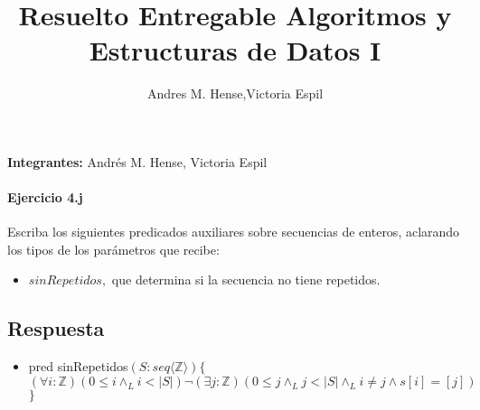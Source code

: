 \documentclass[a4paper]{article}
\title{Resuelto Entregable Algoritmos y Estructuras de Datos I}
\author{Andres M. Hense,Victoria Espil}
\date{} %
\begin{document}




\begin{center}
\textbf{Integrantes:} Andrés M. Hense, Victoria Espil
\end{center}

\paragraph{Ejercicio 4.j} Escriba los siguientes predicados auxiliares sobre secuencias de enteros, aclarando los tipos de los parámetros que recibe:

\begin{itemize}
	\item $sinRepetidos,$ que determina si la secuencia no tiene repetidos.
\end{itemize}

\subsection*{Respuesta}

\begin{itemize}
	\item pred sinRepetidos$(S: seq\langle \mathbb{Z} \rangle)\{$\\
\hspace*{6mm}$(\forall i:\mathbb{Z})(0\leq i\wedge_L i<\vert S\vert)\neg(\exists j:\mathbb{Z})
 (0\leq j\wedge_L j<\vert S\vert \wedge_L i\neq j\wedge s[i]=[j])$\\
$\}$
\end{itemize}
\end{document}
